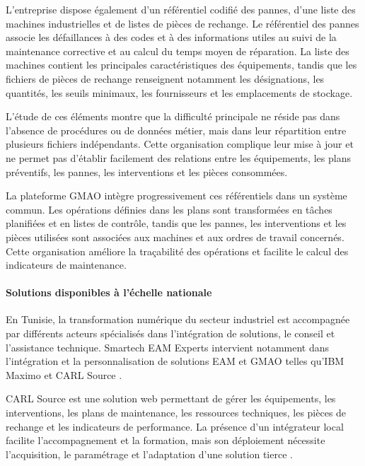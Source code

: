 L’entreprise dispose également d’un référentiel codifié des pannes, d’une liste des machines industrielles et de listes de pièces de rechange. Le référentiel des pannes associe les défaillances à des codes et à des informations utiles au suivi de la maintenance corrective et au calcul du temps moyen de réparation. La liste des machines contient les principales caractéristiques des équipements, tandis que les fichiers de pièces de rechange renseignent notamment les désignations, les quantités, les seuils minimaux, les fournisseurs et les emplacements de stockage.

L’étude de ces éléments montre que la difficulté principale ne réside pas dans l’absence de procédures ou de données métier, mais dans leur répartition entre plusieurs fichiers indépendants. Cette organisation complique leur mise à jour et ne permet pas d’établir facilement des relations entre les équipements, les plans préventifs, les pannes, les interventions et les pièces consommées.

La plateforme GMAO intègre progressivement ces référentiels dans un système commun. Les opérations définies dans les plans sont transformées en tâches planifiées et en listes de contrôle, tandis que les pannes, les interventions et les pièces utilisées sont associées aux machines et aux ordres de travail concernés. Cette organisation améliore la traçabilité des opérations et facilite le calcul des indicateurs de maintenance.


\paragraph{Solutions disponibles à l’échelle nationale}

En Tunisie, la transformation numérique du secteur industriel est accompagnée par différents acteurs spécialisés dans l’intégration de solutions, le conseil et l’assistance technique. Smartech EAM Experts intervient notamment dans l’intégration et la personnalisation de solutions EAM et GMAO telles qu’IBM Maximo et CARL Source \cite{smartech_eam}.

CARL Source est une solution web permettant de gérer les équipements, les interventions, les plans de maintenance, les ressources techniques, les pièces de rechange et les indicateurs de performance. La présence d’un intégrateur local facilite l’accompagnement et la formation, mais son déploiement nécessite l’acquisition, le paramétrage et l’adaptation d’une solution tierce \cite{smartech_carl}.

